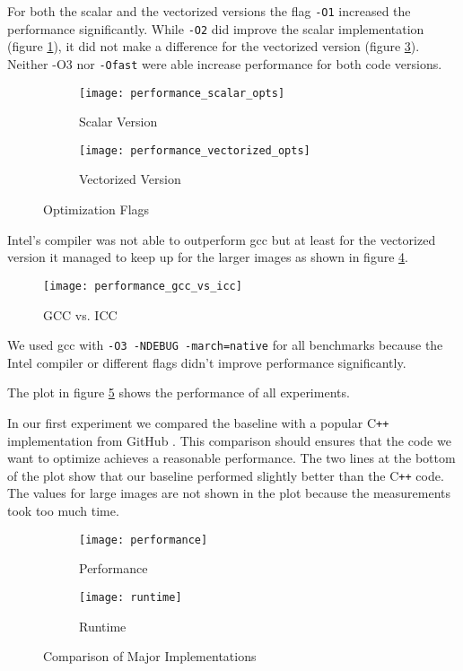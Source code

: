 For both the scalar and the vectorized versions the flag \texttt{-O1} increased
the performance significantly. While \texttt{-O2} did improve the scalar
implementation (figure \ref{fig:perf_scal}), it did not make a difference for
the vectorized version (figure \ref{fig:perf_vec}). Neither \textsc{-O3} nor
\texttt{-Ofast} were able increase performance for both code versions.

\begin{figure}
  \begin{subfigure}[t]{\linewidth}
    \centering
    \texttt{[image: performance\_scalar\_opts]}
    \caption{Scalar Version}
    \label{fig:perf_scal}
  \end{subfigure}
  \begin{subfigure}[b]{\linewidth}
    \centering
    \texttt{[image: performance\_vectorized\_opts]}
    \caption{Vectorized Version}
    \label{fig:perf_vec}
  \end{subfigure}
  \caption{Optimization Flags}
\end{figure}


Intel's compiler was not able to outperform gcc but at least for the vectorized
version it managed to keep up for the larger images as shown in figure
\ref{fig:perf_gcc_vs_icc}.

\begin{figure}
  \centering
  \texttt{[image: performance\_gcc\_vs\_icc]}
  \caption{GCC vs. ICC}
  \label{fig:perf_gcc_vs_icc}
\end{figure}

We used gcc with \verb|-O3 -NDEBUG -march=native| for all benchmarks because the
Intel compiler or different flags didn't improve performance significantly.

 The plot in figure \ref{fig:perf} shows the performance of all
experiments.

In our first experiment we compared the baseline with a popular C\texttt{++} 
implementation from GitHub \cite{github-cpp}. This comparison should ensures that the code
we want to optimize achieves a reasonable performance. The two lines at the bottom of the plot
show that our baseline performed slightly better than the C\texttt{++} code. The values for large
images are not shown in the plot because the measurements took too much time.

\begin{figure}
  \begin{subfigure}[t]{\linewidth}
    \centering
    \texttt{[image: performance]}
    \caption{Performance}
    \label{fig:perf}
  \end{subfigure}
  \begin{subfigure}[t]{\linewidth}
    \centering
    \texttt{[image: runtime]}
    \caption{Runtime}
    \label{fig:runtime}
  \end{subfigure}
  \caption{Comparison of Major Implementations}
\end{figure}

